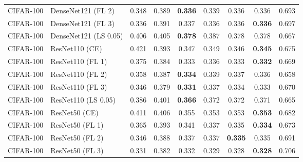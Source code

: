 \begin{table}[h!]
{\begin{tabular}{llccccccc}
   CIFAR-100 &          DenseNet121 (FL 2) &         0.348 &        0.389 & \textbf{0.336} &                  0.339 &                  0.336 &                  0.336 &                  0.693 \\
   CIFAR-100 &          DenseNet121 (FL 3) &         0.336 &        0.391 &                  0.337 &                  0.336 &                  0.336 & \textbf{0.336} &                  0.697 \\
   CIFAR-100 &       DenseNet121 (LS 0.05) &         0.406 &        0.405 & \textbf{0.378} &                  0.387 &                  0.378 &                  0.378 &                  0.667 \\
   CIFAR-100 &              ResNet110 (CE) &         0.421 &        0.393 &                  0.347 &                  0.349 &                  0.346 & \textbf{0.345} &                  0.675 \\
   CIFAR-100 &            ResNet110 (FL 1) &         0.375 &        0.384 &                  0.333 &                  0.336 &                  0.333 & \textbf{0.332} &                  0.669 \\
   CIFAR-100 &            ResNet110 (FL 2) &         0.358 &        0.387 & \textbf{0.334} &                  0.339 &                  0.337 &                  0.336 &                  0.658 \\
   CIFAR-100 &            ResNet110 (FL 3) &         0.346 &        0.379 & \textbf{0.331} &                  0.337 &                  0.334 &                  0.333 &                  0.670 \\
   CIFAR-100 &         ResNet110 (LS 0.05) &         0.386 &        0.401 & \textbf{0.366} &                  0.372 &                  0.372 &                  0.371 &                  0.665 \\
   CIFAR-100 &               ResNet50 (CE) &         0.411 &        0.406 &                  0.355 &                  0.353 &                  0.353 & \textbf{0.353} &                  0.682 \\
   CIFAR-100 &             ResNet50 (FL 1) &         0.365 &        0.393 &                  0.341 &                  0.337 &                  0.335 & \textbf{0.334} &                  0.673 \\
   CIFAR-100 &             ResNet50 (FL 2) &         0.346 &        0.388 &                  0.337 &                  0.337 & \textbf{0.335} &                  0.335 &                  0.691 \\
   CIFAR-100 &             ResNet50 (FL 3) &         0.331 &        0.382 &                  0.332 &                  0.329 &                  0.328 & \textbf{0.328} &                  0.706 \\

\end{tabular}}
\end{table}

